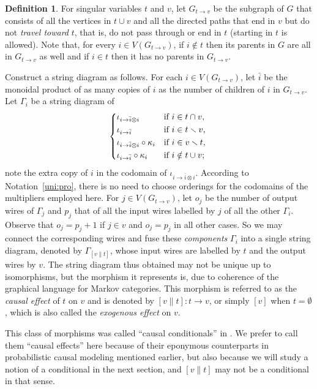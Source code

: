 \documentclass[12pt]{amsart}
\theoremstyle{plain}
\theoremstyle{definition}
\newtheorem{defn}[thm]{Definition}
\theoremstyle{remark}
\numberwithin{equation}{section}
\theoremstyle{plain}
\newcommand{\0}{\emptyset}
\newcommand{\fun}{\longrightarrow}
\newcommand{\mi}{\smallsetminus}
\newcommand{\memph}[1]{{\color{magenta}\emph{#1}}}
\newcommand{\stri}{\Gamma}
\begin{document}
\begin{defn}\label{gen:condi}
For singular variables $t$ and $v$, let $G_{t \rightarrow v}$ be the subgraph of $G$ that consists of all the vertices in $t \cup v$ and all the directed paths that end in $v$ but do not \memph{travel toward} $t$, that is, do not pass through or end in $t$ (starting in $t$ is allowed). Note that, for every  $i \in V(G_{t \rightarrow v})$, if $i \notin t$ then its parents in $G$ are all in $G_{t \rightarrow v}$ as well and if $i \in t$ then it has no parents in $G_{t \rightarrow v}$.

Construct a string diagram  as follows. For each $i \in V(G_{t \rightarrow v})$, let $\bar i$ be the monoidal product of as many copies of $i$ as the number of children of $i$ in $G_{t \rightarrow v}$. Let $\stri_i$ be a  string diagram of
\[
\begin{dcases*}
   \iota_{i \rightarrow \bar i \otimes i}                & if $i \in t \cap v$,\\
   \iota_{i \rightarrow \bar i}                            & if $i \in t \mi v$,\\
  \iota_{i \rightarrow \bar i \otimes i} \circ \kappa_i  & if $i \in v \mi t$,\\
  \iota_{i \rightarrow \bar i} \circ \kappa_i              & if $i \notin t \cup v$;
\end{dcases*}
\]
note  the extra copy of $i$ in the codomain of $\iota_{i \rightarrow \bar i \otimes i}$. According to Notation~\ref{uni:pro}, there is no need to choose orderings for the codomains of the multipliers employed here. For $j \in V(G_{t \rightarrow v})$, let $o_j$ be the number of output wires of $\stri_j$ and $p_j$ that of all the input wires labelled by $j$ of all the other  $\stri_i$. Observe that  $o_j = p_j + 1$ if $j \in v$ and  $o_j = p_j$ in all other cases. So we may connect the corresponding wires and fuse these \memph{components} $\stri_i$ into a single  string diagram, denoted by $\stri_{[v \| t]}$, whose input wires are labelled by $t$ and the output wires by $v$.  The string diagram thus obtained may not be unique up to isomorphisms, but the morphism it represents is, due to  coherence of  the graphical language for Markov categories. This morphism is referred to as the \memph{causal effect} of $t$ on $v$ and is denoted by $[v \| t] : t \fun v$, or simply $[v]$ when $t = \0$, which is also called the \memph{exogenous effect} on $v$.
\end{defn}

This class of morphisms was called ``causal conditionals'' in \cite[\S~4]{Fong:thesis}. We prefer to call them ``causal effects'' here because of their eponymous counterparts in probabilistic causal modeling mentioned earlier, but also because we will study a notion of a conditional in the next section, and $[v \| t]$ may not be a conditional in that sense.
\end{document}
